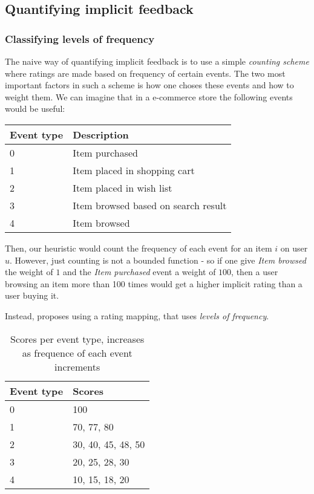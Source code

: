 \clearpage


\subsection{Quantifying implicit feedback}

\subsubsection{Classifying levels of frequency}

The naive way of quantifying implicit feedback is to use a simple
\textit{counting scheme} where ratings are made based on frequency of certain
events. The two most important factors in such a scheme is how one choses these
events and how to weight them. We can imagine that in a e-commerce store the
following events would be useful:

\begin{table}[H]
  \centering
  \begin{tabular}{|l|l|}
  \hline
  Event type & Description \\ \hline
  0 & Item purchased \\
  1 & Item placed in shopping cart \\
  2 & Item placed in wish list \\
  3 & Item browsed based on search result \\
  4 & Item browsed \\
  \hline
  \end{tabular}
\end{table}

Then, our heuristic would count the frequency of each event for an item $i$ on
user $u$. However, just counting is not a bounded function - so if one give
\textit{Item browsed} the weight of $1$ and the \textit{Item purchased} event
a weight of $100$, then a user browsing an item more than 100 times would get a
higher implicit rating than a user buying it.

Instead, \cite{pkghost2014implicit} proposes using a rating mapping, that uses
\textit{levels of frequency}.

\begin{table}[H]
  \centering
  \begin{tabular}{|l|l|}
  \hline
  Event type & Scores \\ \hline
  0 & 100 \\
  1 & 70, 77, 80 \\
  2 & 30, 40, 45, 48, 50 \\
  3 & 20, 25, 28, 30 \\
  4 & 10, 15, 18, 20 \\
  \hline
  \end{tabular}
  \caption{Scores per event type, increases as frequence of each event
           increments}
  \label{implicit-table}
\end{table}

